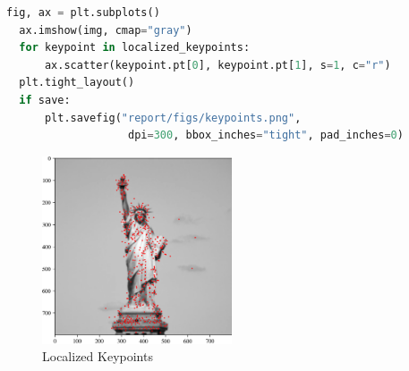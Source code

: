 \documentclass[11pt,a4paper]{article}
\begin{document}
\begin{lstlisting}[language=Python, caption=Keypoint localization]
  fig, ax = plt.subplots()
  ax.imshow(img, cmap="gray")
  for keypoint in localized_keypoints:
      ax.scatter(keypoint.pt[0], keypoint.pt[1], s=1, c="r")
  plt.tight_layout()
  if save:
      plt.savefig("report/figs/keypoints.png",
                   dpi=300, bbox_inches="tight", pad_inches=0)
\end{lstlisting}

\begin{figure}[ht!]
  \centering
  \includegraphics[width=0.5\textwidth]{figs/keypoints.png}
  \caption{Localized Keypoints}
\end{figure}
\end{document}
